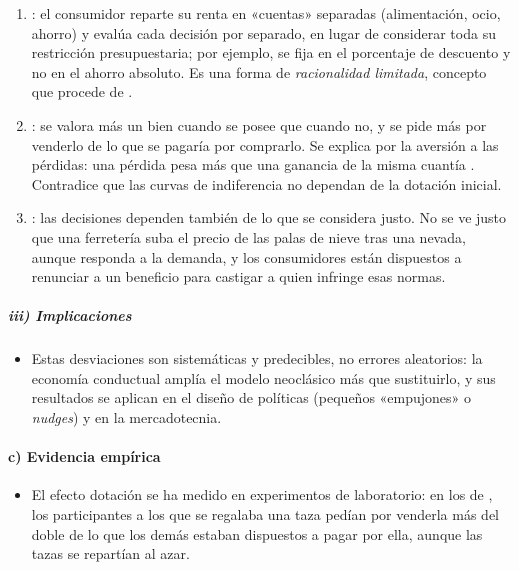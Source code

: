 \documentclass[11pt]{article}
\begin{document}
\begin{enumerate}
\item {}\nocite{Thaler1985Mental}: el consumidor reparte su renta en «cuentas» separadas (alimentación, ocio, ahorro) y evalúa cada decisión por separado, en lugar de considerar toda su restricción presupuestaria; por ejemplo, se fija en el porcentaje de descuento y no en el ahorro absoluto. Es una forma de \emph{racionalidad limitada}, concepto que procede de \textcite{Simon1955Behavioral}.
\item {}\nocite{Thaler1980Positive}: se valora más un bien cuando se posee que cuando no, y se pide más por venderlo de lo que se pagaría por comprarlo. Se explica por la aversión a las pérdidas: una pérdida pesa más que una ganancia de la misma cuantía\nocite{KahnemanTversky1979Prospect,KahnemanKnetschThaler1990Endowment} . Contradice que las curvas de indiferencia no dependan de la dotación inicial.
\item {}: las decisiones dependen también de lo que se considera justo. No se ve justo que una ferretería suba el precio de las palas de nieve tras una nevada, aunque responda a la demanda, y los consumidores están dispuestos a renunciar a un beneficio para castigar a quien infringe esas normas\nocite{KahnemanKnetschThaler1986Fairness}.
\end{enumerate}

\subparagraph{iii) Implicaciones}

\begin{itemize}
\item Estas desviaciones son sistemáticas y predecibles, no errores aleatorios: la economía conductual amplía el modelo neoclásico más que sustituirlo, y sus resultados se aplican en el diseño de políticas (pequeños «empujones» o \emph{nudges}) y en la mercadotecnia.
\end{itemize}

\paragraph{c) Evidencia empírica}

\begin{itemize}
\item El efecto dotación se ha medido en experimentos de laboratorio: en los de \textcite{KahnemanKnetschThaler1990Endowment}, los participantes a los que se regalaba una taza pedían por venderla más del doble de lo que los demás estaban dispuestos a pagar por ella, aunque las tazas se repartían al azar.
\end{itemize}
\end{document}
